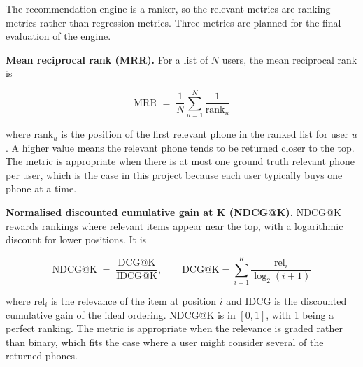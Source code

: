 \documentclass[12pt, a4paper]{report}
\numberwithin{figure}{chapter}
\numberwithin{table}{chapter}
\numberwithin{equation}{chapter}
\begin{document}
The recommendation engine is a ranker, so the relevant metrics are ranking metrics rather than regression metrics. Three metrics are planned for the final evaluation of the engine.

\textbf{Mean reciprocal rank (MRR).} For a list of $N$ users, the mean reciprocal rank is

\begin{equation}
\text{MRR} \;=\; \frac{1}{N} \sum_{u=1}^{N} \frac{1}{\text{rank}_u}
\label{eq:mrr}
\end{equation}

\noindent where $\text{rank}_u$ is the position of the first relevant phone in the ranked list for user $u$. A higher value means the relevant phone tends to be returned closer to the top. The metric is appropriate when there is at most one ground truth relevant phone per user, which is the case in this project because each user typically buys one phone at a time.

\textbf{Normalised discounted cumulative gain at K (NDCG@K).} NDCG@K rewards rankings where relevant items appear near the top, with a logarithmic discount for lower positions. It is

\begin{equation}
\text{NDCG@K} \;=\; \frac{\text{DCG@K}}{\text{IDCG@K}}, \qquad \text{DCG@K} = \sum_{i=1}^{K} \frac{\text{rel}_i}{\log_2(i + 1)}
\label{eq:ndcg}
\end{equation}

\noindent where $\text{rel}_i$ is the relevance of the item at position $i$ and IDCG is the discounted cumulative gain of the ideal ordering. NDCG@K is in $[0, 1]$, with 1 being a perfect ranking. The metric is appropriate when the relevance is graded rather than binary, which fits the case where a user might consider several of the returned phones.


\end{document}
